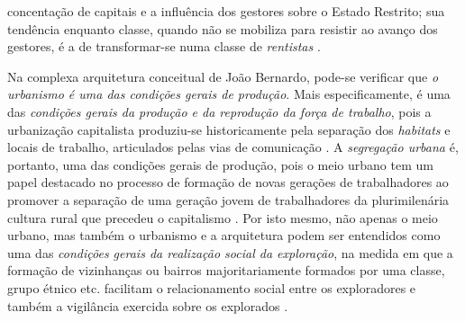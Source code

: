 concentação de capitais e a influência dos gestores sobre o Estado Restrito; sua tendência enquanto classe, quando não se mobiliza para resistir ao avanço dos gestores, é a de transformar-se numa classe de \textit{rentistas} \cite[p.~208-216]{BERNARDO1991}.

Na complexa arquitetura conceitual de João Bernardo, pode-se verificar que \textit{o urbanismo é uma das condições gerais de produção}. Mais especificamente, é uma das \textit{condições gerais da produção e da reprodução da força de trabalho}, pois a urbanização capitalista produziu-se historicamente pela separação dos \textit{habitats} e locais de trabalho, articulados pelas vias de comunicação \cite[p.~159]{BERNARDO1991}. A \textit{segregação urbana} é, portanto, uma das condições gerais de produção, pois o meio urbano tem um papel destacado no processo de formação de novas gerações de trabalhadores ao promover a separação de uma geração jovem de trabalhadores da plurimilenária cultura rural que precedeu o capitalismo \cite[p.~82-83]{BERNARDO1991}. Por isto mesmo, não apenas o meio urbano, mas também o urbanismo e a arquitetura podem ser entendidos como uma das \textit{condições gerais da realização social da exploração}, na medida em que a formação de vizinhanças ou bairros majoritariamente formados por uma classe, grupo étnico etc. facilitam o relacionamento social entre os exploradores e também a vigilância exercida sobre os explorados \cite[p.~160]{BERNARDO1991}. 


